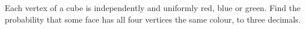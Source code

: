 Each vertex of a cube is independently and uniformly red, blue or green. Find the probability that some face has all four vertices the same colour, to three decimals.
